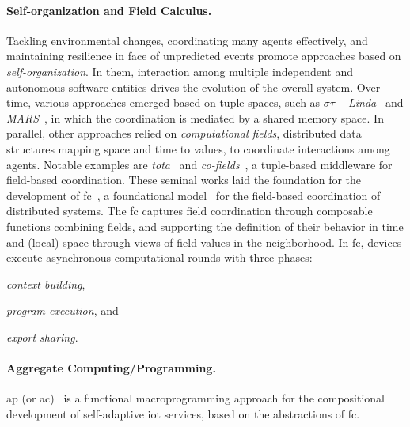 \documentclass[12pt, a4paper]{article}
\newenvironment{inlinelist}{\begin{enumerate*}[label=\emph{(\roman*)}]}{\end{enumerate*}}
\begin{document}
\sloppypar
\paragraph{Self-organization and Field Calculus.}

Tackling environmental changes, coordinating many agents effectively, and maintaining resilience
in face of unpredicted events promote approaches based on \emph{self-organization}.
%
In them,
interaction among multiple independent and autonomous software entities drives the evolution of the overall system.
%
Over time,
various approaches emerged based on tuple spaces,
such as \textit{$\sigma\tau-$Linda}~\cite{ViroliCoordination2012} and \textit{MARS}~\cite{mars},
in which the coordination is mediated by a shared memory space.
%
In parallel,
other approaches relied on \emph{computational fields},
distributed data structures mapping space and time to values,
to coordinate interactions among agents.
%
Notable examples are \emph{\ac{tota}}~\cite{tota} and \emph{co-fields}~\cite{MameiZL04},
a tuple-based middleware
for field-based coordination.
%
These seminal works laid the foundation for the development of \ac{fc}~\cite{JLAMP2019},
a foundational model~\cite{TOCL2019} for the field-based coordination of distributed systems.
%
The \ac{fc} captures field coordination through composable functions
combining fields, and supporting the definition of their behavior in time
and (local) space through views of field values in the neighborhood.
%
%
In \ac{fc}, devices execute asynchronous computational rounds with three phases:
\begin{inlinelist}
    \item \emph{context building},
    \item \emph{program execution}, and
    \item \emph{export sharing}.
\end{inlinelist}
%

\sloppypar
\paragraph{Aggregate Computing/Programming.}
\ac{ap} (or \ac{ac})~\cite{BealIEEEComputer2015} is a functional macroprogramming approach for the compositional development
of self-adaptive \ac{iot} services,
based on the abstractions of \ac{fc}.
\end{document}
